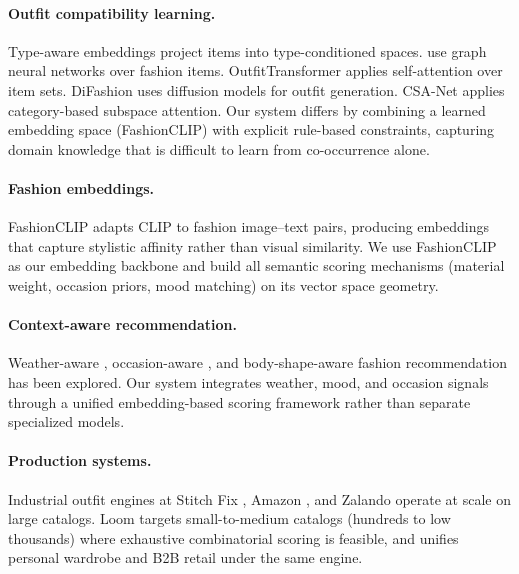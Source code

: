 \documentclass[10pt,twocolumn]{article}
\begin{document}
\paragraph{Outfit compatibility learning.}
Type-aware embeddings \citep{vasileva2018learning} project items into
type-conditioned spaces.  \citet{cui2019dressing} use graph neural networks
over fashion items.  OutfitTransformer \citep{sarkar2023outfittransformer}
applies self-attention over item sets.  DiFashion \citep{xu2024difashion}
uses diffusion models for outfit generation.  CSA-Net \citep{lin2020csanet}
applies category-based subspace attention.  Our system differs by combining
a learned embedding space (FashionCLIP) with explicit rule-based
constraints, capturing domain knowledge that is difficult to learn from
co-occurrence alone.

\paragraph{Fashion embeddings.}
FashionCLIP \citep{chia2022fashionclip} adapts CLIP \citep{radford2021clip}
to fashion image--text pairs, producing embeddings that capture stylistic
affinity rather than visual similarity.  We use FashionCLIP as our embedding
backbone and build all semantic scoring mechanisms (material weight, occasion
priors, mood matching) on its vector space geometry.

\paragraph{Context-aware recommendation.}
Weather-aware \citep{chen2019weather}, occasion-aware
\citep{lin2020occasion}, and body-shape-aware \citep{hidayati2021dress}
fashion recommendation has been explored.  Our system integrates weather,
mood, and occasion signals through a unified embedding-based scoring
framework rather than separate specialized models.

\paragraph{Production systems.}
Industrial outfit engines at Stitch Fix \citep{chen2019stitchfix}, Amazon
\citep{kang2017visually}, and Zalando operate at scale on large catalogs.
Loom targets small-to-medium catalogs (hundreds to low thousands) where
exhaustive combinatorial scoring is feasible, and unifies personal wardrobe
and B2B retail under the same engine.

\end{document}
